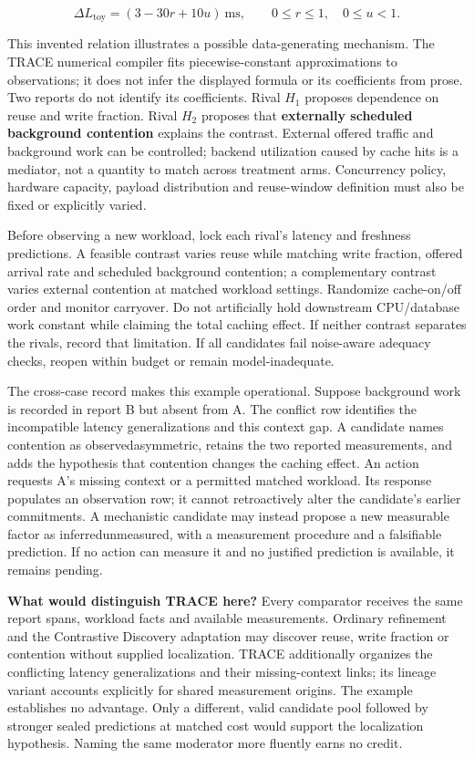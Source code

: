 \documentclass[11pt,a4paper]{article}
\newcommand{\CNSIdentifier}[1]{{\small\ttfamily\def\_{\textunderscore\allowbreak}#1}}
\begin{document}
\[
\Delta L_{\mathrm{toy}}=(3-30r+10u)\ \mathrm{ms},\qquad 0\le r\le1,\quad0\le u<1.
\]

This invented relation illustrates a possible data-generating mechanism.
The TRACE numerical compiler fits piecewise-constant approximations to
observations; it does not infer the displayed formula or its
coefficients from prose. Two reports do not identify its coefficients.
Rival \(H_1\) proposes dependence on reuse and write fraction. Rival
\(H_2\) proposes that \textbf{externally scheduled background
contention} explains the contrast. External offered traffic and
background work can be controlled; backend utilization caused by cache
hits is a mediator, not a quantity to match across treatment arms.
Concurrency policy, hardware capacity, payload distribution and
reuse-window definition must also be fixed or explicitly varied.

Before observing a new workload, lock each rival's latency and freshness
predictions. A feasible contrast varies reuse while matching write
fraction, offered arrival rate and scheduled background contention; a
complementary contrast varies external contention at matched workload
settings. Randomize cache-on/off order and monitor carryover. Do not
artificially hold downstream CPU/database work constant while claiming
the total caching effect. If neither contrast separates the rivals,
record that limitation. If all candidates fail noise-aware adequacy
checks, reopen within budget or remain model-inadequate.

The cross-case record makes this example operational. Suppose background
work is recorded in report B but absent from A. The conflict row
identifies the incompatible latency generalizations and this context
gap. A candidate names contention as \CNSIdentifier{observed\_asymmetric},
retains the two reported measurements, and adds the hypothesis that
contention changes the caching effect. An action requests A's missing
context or a permitted matched workload. Its response populates an
observation row; it cannot retroactively alter the candidate's earlier
commitments. A mechanistic candidate may instead propose a new
measurable factor as \CNSIdentifier{inferred\_unmeasured}, with a measurement
procedure and a falsifiable prediction. If no action can measure it and
no justified prediction is available, it remains pending.

\textbf{What would distinguish TRACE here?} Every comparator receives
the same report spans, workload facts and available measurements.
Ordinary refinement and the Contrastive Discovery adaptation may
discover reuse, write fraction or contention without supplied
localization. TRACE additionally organizes the conflicting latency
generalizations and their missing-context links; its lineage variant
accounts explicitly for shared measurement origins. The example
establishes no advantage. Only a different, valid candidate pool
followed by stronger sealed predictions at matched cost would support
the localization hypothesis. Naming the same moderator more fluently
earns no credit.
\end{document}
